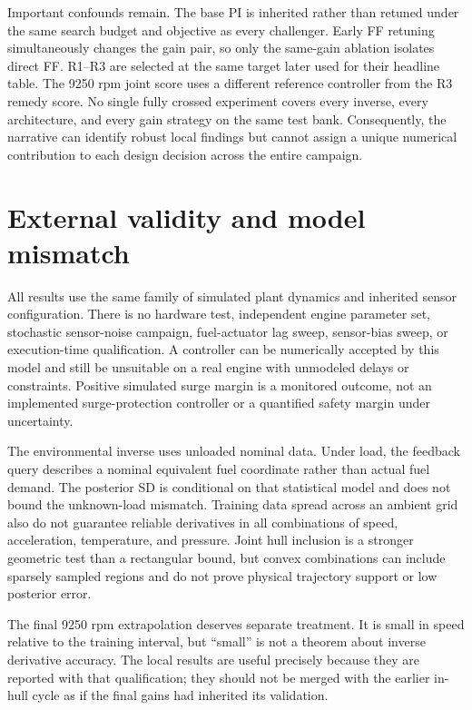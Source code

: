 \documentclass[11pt,a4paper,oneside]{report}
\begin{document}
Important confounds remain. The base PI is inherited rather than retuned under the same search budget and objective as every challenger. Early FF retuning simultaneously changes the gain pair, so only the same-gain ablation isolates direct FF. R1--R3 are selected at the same target later used for their headline table. The 9250 rpm joint score uses a different reference controller from the R3 remedy score. No single fully crossed experiment covers every inverse, every architecture, and every gain strategy on the same test bank. Consequently, the narrative can identify robust local findings but cannot assign a unique numerical contribution to each design decision across the entire campaign.

\section{External validity and model mismatch}
All results use the same family of simulated plant dynamics and inherited sensor configuration. There is no hardware test, independent engine parameter set, stochastic sensor-noise campaign, fuel-actuator lag sweep, sensor-bias sweep, or execution-time qualification. A controller can be numerically accepted by this model and still be unsuitable on a real engine with unmodeled delays or constraints. Positive simulated surge margin is a monitored outcome, not an implemented surge-protection controller or a quantified safety margin under uncertainty.

The environmental inverse uses unloaded nominal data. Under load, the feedback query describes a nominal equivalent fuel coordinate rather than actual fuel demand. The posterior SD is conditional on that statistical model and does not bound the unknown-load mismatch. Training data spread across an ambient grid also do not guarantee reliable derivatives in all combinations of speed, acceleration, temperature, and pressure. Joint hull inclusion is a stronger geometric test than a rectangular bound, but convex combinations can include sparsely sampled regions and do not prove physical trajectory support or low posterior error.

The final 9250 rpm extrapolation deserves separate treatment. It is small in speed relative to the training interval, but ``small'' is not a theorem about inverse derivative accuracy. The local results are useful precisely because they are reported with that qualification; they should not be merged with the earlier in-hull cycle as if the final gains had inherited its validation.
\end{document}
